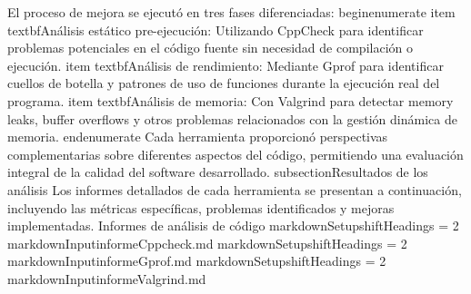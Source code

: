 {}El proceso de mejora se ejecutó en tres fases diferenciadas:\markdownRendererInterblockSeparator
{}\markdownRendererBackslash{}begin\markdownRendererLeftBrace{}enumerate\markdownRendererRightBrace{} \markdownRendererBackslash{}item \markdownRendererBackslash{}textbf\markdownRendererLeftBrace{}Análisis estático pre-ejecución\markdownRendererRightBrace{}: Utilizando CppCheck para identificar problemas potenciales en el código fuente sin necesidad de compilación o ejecución.\markdownRendererInterblockSeparator
{}\markdownRendererBackslash{}item \markdownRendererBackslash{}textbf\markdownRendererLeftBrace{}Análisis de rendimiento\markdownRendererRightBrace{}: Mediante Gprof para identificar cuellos de botella y patrones de uso de funciones durante la ejecución real del programa.\markdownRendererInterblockSeparator
{}\markdownRendererBackslash{}item \markdownRendererBackslash{}textbf\markdownRendererLeftBrace{}Análisis de memoria\markdownRendererRightBrace{}: Con Valgrind para detectar memory leaks, buffer overflows y otros problemas relacionados con la gestión dinámica de memoria. \markdownRendererBackslash{}end\markdownRendererLeftBrace{}enumerate\markdownRendererRightBrace{}\markdownRendererInterblockSeparator
{}Cada herramienta proporcionó perspectivas complementarias sobre diferentes aspectos del código, permitiendo una evaluación integral de la calidad del software desarrollado.\markdownRendererInterblockSeparator
{}\markdownRendererBackslash{}subsection\markdownRendererLeftBrace{}Resultados de los análisis\markdownRendererRightBrace{}\markdownRendererInterblockSeparator
{}Los informes detallados de cada herramienta se presentan a continuación, incluyendo las métricas específicas, problemas identificados y mejoras implementadas.\markdownRendererInterblockSeparator
{}\markdownRendererPercentSign{} Informes de análisis de código \markdownRendererBackslash{}markdownSetup\markdownRendererLeftBrace{}shiftHeadings = 2\markdownRendererRightBrace{} \markdownRendererBackslash{}markdownInput\markdownRendererLeftBrace{}informeCppcheck.md\markdownRendererRightBrace{}\markdownRendererInterblockSeparator
{}\markdownRendererBackslash{}markdownSetup\markdownRendererLeftBrace{}shiftHeadings = 2\markdownRendererRightBrace{} \markdownRendererBackslash{}markdownInput\markdownRendererLeftBrace{}informeGprof.md\markdownRendererRightBrace{}\markdownRendererInterblockSeparator
{}\markdownRendererBackslash{}markdownSetup\markdownRendererLeftBrace{}shiftHeadings = 2\markdownRendererRightBrace{} \markdownRendererBackslash{}markdownInput\markdownRendererLeftBrace{}informeValgrind.md\markdownRendererRightBrace{}\markdownRendererInterblockSeparator
